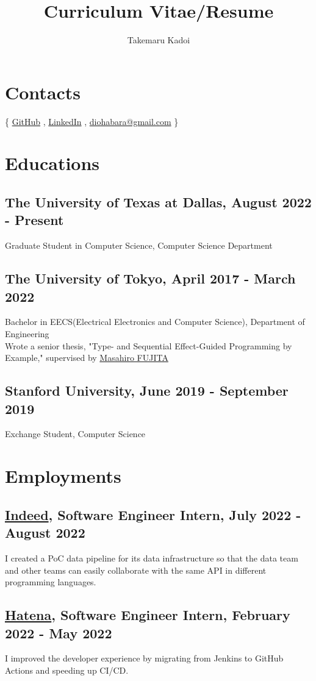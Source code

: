 \documentclass[12pt]{article}
\title{\vspace{-1cm}Curriculum Vitae/Resume}
\author{Takemaru Kadoi}
\date{}
\begin{document}

\section*{Contacts}
  \{
    \href{https://github.com/diohabara/}{GitHub}
    , \href{https://www.linkedin.com/in/takemaru-kadoi}{LinkedIn}
    , \href{mailto:diohabara@gmail.com}{diohabara@gmail.com}
  \}

\section*{Educations}
  \subsection*{The University of Texas at Dallas, August 2022 - Present}
    Graduate Student in Computer Science, Computer Science Department
  \subsection*{The University of Tokyo, April 2017 - March 2022}
    Bachelor in EECS(Electrical Electronics and Computer Science), Department of Engineering
    \\
    Wrote a senior thesis, "Type- and Sequential Effect-Guided Programming by Example," supervised by \href{https://www.cad.t.u-tokyo.ac.jp/en/}{Masahiro FUJITA}
  \subsection*{Stanford University, June 2019 - September 2019}
    Exchange Student, Computer Science

\section*{Employments}
  \subsection*{\href{https://www.indeed.com/about}{Indeed}, Software Engineer Intern, July 2022 - August 2022}
    I created a PoC data pipeline for its data infrastructure so that the data team and other teams can easily collaborate with the same API in different programming languages.
  \subsection*{\href{https://hatenacorp.jp/}{Hatena}, Software Engineer Intern, February 2022 - May 2022}
    I improved the developer experience by migrating from Jenkins to GitHub Actions and speeding up CI/CD.
\end{document}
